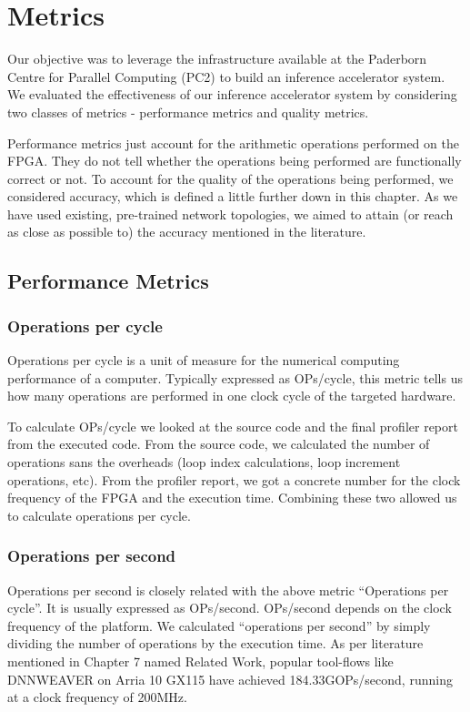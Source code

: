 \chapter{Metrics} \label{chp:Metrics}
Our objective was to leverage the infrastructure available at the Paderborn Centre for Parallel Computing (PC2) to build an inference accelerator system. We evaluated the effectiveness of our inference accelerator system by considering two classes of metrics - performance metrics and quality metrics.  

Performance metrics just account for the arithmetic operations performed on the FPGA. They do not tell whether the operations being performed are functionally correct or not. To account for the quality of the operations being performed, we considered accuracy, which is defined a little further down in this chapter. As we have used existing, pre-trained network topologies, we aimed to attain (or reach as close as possible to)  the accuracy mentioned in the literature.

\section{Performance Metrics}

\subsection{Operations per cycle}
Operations per cycle is a unit of measure for the numerical computing performance of a computer. Typically expressed as OPs/cycle, this metric tells us how many operations are performed in one clock cycle of the targeted hardware.  

To calculate OPs/cycle we looked at the source code and the final profiler report from the executed code. From the source code, we calculated the number of operations sans the overheads (loop index calculations, loop increment operations, etc). From the profiler report, we got a concrete number for the clock frequency of the FPGA and the execution time. Combining these two allowed us to calculate operations per cycle.

\subsection{Operations per second}
Operations per second is closely related with the above metric “Operations per cycle”. It is usually expressed as OPs/second. OPs/second depends on the clock frequency of the platform. 
We calculated “operations per second” by simply dividing the number of operations by the execution time.  
As per literature mentioned in Chapter 7 named Related Work, popular tool-flows like DNNWEAVER on Arria 10 GX115 have achieved 184.33GOPs/second, running at a clock frequency of 200MHz.

